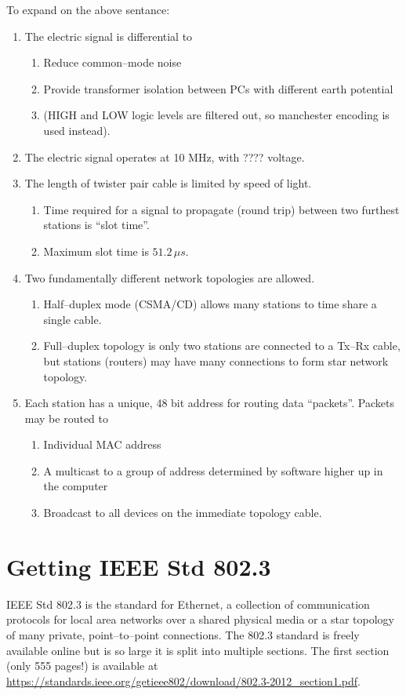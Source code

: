 \documentclass{article}
\begin{document}
To expand on the above sentance:
\begin{enumerate}
\item The electric signal is differential to
	\begin{enumerate}
		\item Reduce common--mode noise
		\item Provide transformer isolation between PCs with different earth potential
		\item (HIGH and LOW logic levels are filtered out, so manchester encoding is used instead).
	\end{enumerate}
\item The electric signal operates at 10 MHz, with ???? voltage.
\item The length of twister pair cable is limited by speed of light.
	\begin{enumerate}
		\item Time required for a signal to propagate (round trip) between two furthest stations is ``slot time''.
		\item Maximum slot time is $51.2\,\mu s$.
	\end{enumerate}
\item Two fundamentally different network topologies are allowed.
	\begin{enumerate}
		\item Half--duplex mode (CSMA/CD) allows many stations to time share a single cable.
		\item Full--duplex topology is only two stations are connected to a Tx--Rx cable,
			but stations (routers) may have many connections to form star network topology.
	\end{enumerate}
\item Each station has a unique, 48 bit address for routing data ``packets''. Packets may be routed to
	\begin{enumerate}
		\item Individual MAC address
		\item A multicast to a group of address determined by software higher up in the computer
		\item Broadcast to all devices on the immediate topology cable.
	\end{enumerate}
\end{enumerate}




\section{Getting IEEE Std 802.3}
IEEE Std 802.3 is the standard for Ethernet, a collection of communication
protocols for local area networks over a shared
physical media or a star topology of many private, point--to--point connections.
The 802.3 standard is freely available online but is so large it is split
into multiple sections. The first section (only 555 pages!) is available
at
\url{https://standards.ieee.org/getieee802/download/802.3-2012\_section1.pdf}.
\end{document}
